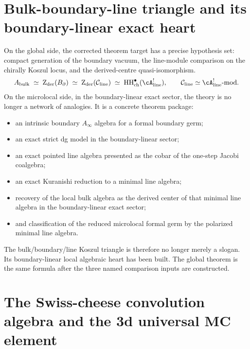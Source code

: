 \section{Bulk-boundary-line triangle and its boundary-linear exact heart}

On the global side, the corrected theorem target has a precise
hypothesis set: compact generation of the boundary vacuum, the
line-module comparison on the chirally Koszul locus, and the
derived-centre quasi-isomorphism.
\[
\Abulk
\;\simeq\;
\Zder(\Bbound)
\;\simeq\;
\Zder(\cC_{\mathrm{line}})
\;\simeq\;
\HH^\bullet_{\mathrm{ch}}(\cA^!_{\mathrm{line}}),
\qquad
\cC_{\mathrm{line}}\simeq \cA^!_{\mathrm{line}}\text{-mod}.
\]
On the microlocal side, in the boundary-linear exact sector, the
theory is no longer a network of analogies. It is a concrete
theorem package:
\begin{itemize}[leftmargin=1.8em]
\item an intrinsic boundary $A_\infty$ algebra for a formal boundary germ;
\item an exact strict dg model in the boundary-linear sector;
\item an exact pointed line algebra presented as the cobar of the one-step Jacobi coalgebra;
\item an exact Kuranishi reduction to a minimal line algebra;
\item recovery of the local bulk algebra as the derived center of that minimal line algebra in the boundary-linear exact sector;
\item and classification of the reduced microlocal formal germ by the polarized minimal line algebra.
\end{itemize}

The bulk/boundary/line Koszul triangle is therefore no longer merely a
slogan. Its boundary-linear local algebraic heart has been built. The
global theorem is the same formula after the three named comparison
inputs are constructed.

\section{The Swiss-cheese convolution algebra and the 3d universal
MC element}\label{sec:sc-convolution-mc}

\providecommand{\ModEnv}{\operatorname{ModEnv}}
\providecommand{\Tr}{\operatorname{Tr}}
\providecommand{\ohat}{\widehat{\otimes}}
\providecommand{\Mbar}{\overline{\mathcal M}}
\providecommand{\Rring}{R^{\bullet}}
\providecommand{\gSC}{\mathfrak{g}^{\mathrm{SC}}}
\providecommand{\SCop}{\mathsf{SC}^{\mathrm{ch,top}}}
\providecommand{\ov}[1]{\overline{#1}}
\providecommand{\M}{\mathcal{M}}

